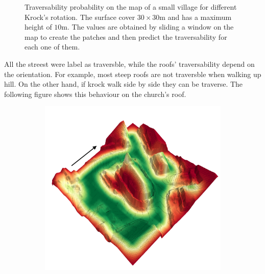 \documentclass[../document.tex]{subfiles}
\begin{document}
\begin{figure} [htbp]
\begin{subfigure}[b]{0.45\textwidth}
  \end{subfigure}
  \caption{Traversability probability on the map of a small village for different Krock's rotation. The surface cover $30\times 30$m and has a maximum height of $10$m. The values are obtained by sliding a window on the map to create the patches and then predict the traversability for each one of them.}
  \end{figure}
  All the streest were label as traversble, while the roofs' traversability depend on the orientation. For example, most steep roofs are not traversble when walking up hill. On the other hand, if krock walk side by side they can be traverse. The following figure shows this behaviour on the church's roof.
  \begin{figure} [htbp]
    \centering
    \begin{subfigure}[b]{0.45\textwidth}
      \includegraphics[width=\linewidth]{../img/4/traversability/sullens-church/-270.png} 
    \end{subfigure}
    \begin{subfigure}[b]{0.45\textwidth}

\end{subfigure}
\end{figure}
\end{document}
